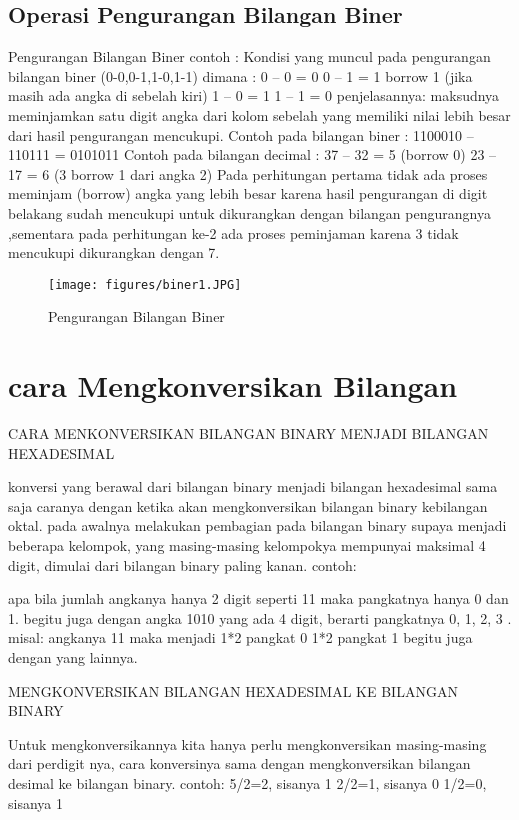 \subsection {Operasi Pengurangan Bilangan Biner}	
	Pengurangan Bilangan Biner
	contoh :
Kondisi yang muncul pada pengurangan bilangan biner (0-0,0-1,1-0,1-1) dimana :
0 – 0 = 0
0 – 1 = 1 borrow 1 (jika masih ada angka di sebelah kiri)
1 – 0 = 1
1 – 1 = 0
penjelasannya: maksudnya meminjamkan satu digit angka dari kolom sebelah yang memiliki nilai lebih besar dari hasil pengurangan mencukupi.
Contoh pada bilangan biner :
1100010 – 110111 = 0101011 
Contoh pada bilangan decimal :
37 – 32 = 5 (borrow 0)
23 – 17 = 6 (3 borrow 1 dari angka 2)
Pada perhitungan pertama tidak ada proses meminjam (borrow) angka yang lebih besar karena hasil pengurangan di digit belakang sudah mencukupi untuk dikurangkan dengan bilangan pengurangnya ,sementara pada perhitungan ke-2 ada proses peminjaman karena 3 tidak mencukupi dikurangkan dengan 7.


\begin{figure}[ht]
\centerline{\texttt{[image: figures/biner1.JPG]}}
\caption{Pengurangan Bilangan Biner}
\label{BilanganBiner}
\end {figure}


\section {cara Mengkonversikan Bilangan}
 CARA MENKONVERSIKAN BILANGAN BINARY MENJADI BILANGAN HEXADESIMAL
 
 konversi yang berawal dari bilangan binary menjadi bilangan hexadesimal sama saja caranya dengan ketika akan mengkonversikan bilangan binary kebilangan oktal. pada awalnya melakukan pembagian pada bilangan binary supaya menjadi beberapa kelompok, yang masing-masing kelompokya mempunyai maksimal 4 digit, dimulai dari bilangan binary paling kanan.
contoh:
 
apa bila jumlah angkanya hanya 2 digit seperti 11 maka pangkatnya hanya 0 dan 1. begitu juga dengan angka 1010 yang ada 4 digit, berarti pangkatnya 0, 1, 2, 3 . 
misal: angkanya 11 maka menjadi
		1*2 pangkat 0
		1*2 pangkat 1
		begitu juga dengan yang lainnya.


MENGKONVERSIKAN BILANGAN HEXADESIMAL KE BILANGAN BINARY

Untuk mengkonversikannya kita hanya perlu mengkonversikan masing-masing dari perdigit nya, cara konversinya sama dengan mengkonversikan bilangan desimal ke bilangan binary.
contoh: 
	5/2=2, sisanya 1
	2/2=1, sisanya 0
	1/2=0, sisanya 1
	
